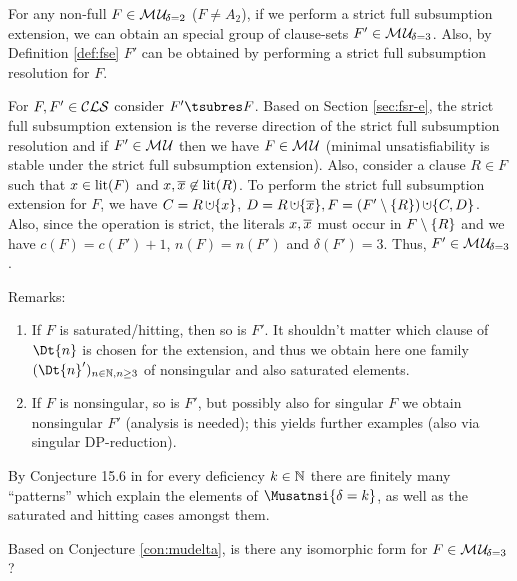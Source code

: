 \documentclass{report}
\begin{document}
\begin{lem}\label{lem:mu2tomu3}
For any non-full $F \in \mathcal{M\hspace{0.8pt}U}_{\!\delta=2}$ ($F \not = A_2$), if we perform a strict full subsumption extension, we can obtain an special group of clause-sets $F' \in \mathcal{M\hspace{0.8pt}U}_{\!\delta=3}$. Also, by Definition \ref{def:fse} $F'$ can be obtained by performing a strict full subsumption resolution for $F$.
\end{lem}
\begin{prf}
For $F, F' \in \mathcal{CLS}$ consider $ F' \tsubres F$. Based on Section \ref{sec:fsr-e}, the strict full subsumption extension is the reverse direction of the  strict full subsumption resolution and if $F' \in \mathcal{M\hspace{0.8pt}U}$ then we have $F \in \mathcal{M\hspace{0.8pt}U}$ (minimal unsatisfiability is stable under the strict full subsumption extension). Also, consider a clause $R \in F$ such that $ x \in \operatorname{lit}(F)$ and $x, \overline x \not \in \operatorname{lit}(R)$. To perform the strict full subsumption extension for $F$, we have $C = R \addcup \set{x}$, $D = R \addcup \set{\ol{x}}, F = (F' \sm \set{R}) \addcup \set{C,D}$. Also, since the operation is strict, the literals $x, \overline x$ must occur in $F \setminus \{ R \}$ and we have $c(F)=c(F')+1$, $n(F)=n(F')$ and $\delta(F')=3$. Thus, $F' \in \mathcal{M\hspace{0.8pt}U}_{\!\delta=3}$.

\end{prf}
Remarks:
\begin{enumerate}
\item If $F$ is saturated/hitting, then so is $F'$. It shouldn't matter which clause of $\Dt{n}$ is chosen for the extension, and thus we obtain here one family $(\Dt{n}')_{n \in \NN, n \ge 3}$ of nonsingular and also saturated elements.
\item If $F$ is nonsingular, so is $F'$, but possibly also for singular $F$ we obtain nonsingular $F'$ (analysis is needed); this yields further examples (also via singular DP-reduction).
\end{enumerate}

\begin{conj}\label{con:mudelta}
By Conjecture 15.6 in \cite{KullmannZhao2010Extremal} for every deficiency $k \in \mathbb{N}$ there are finitely many ``patterns'' which explain the elements of $\Musatnsi{\delta=k}$, as well as the saturated and hitting cases amongst them.
\end{conj}
 
\begin{quest}\label{que:str-3}
Based on Conjecture \ref{con:mudelta}, is there any isomorphic form for $F \in \mathcal{M\hspace{0.8pt}U}_{\!\delta=3}$?
\end{quest}
\end{document}
